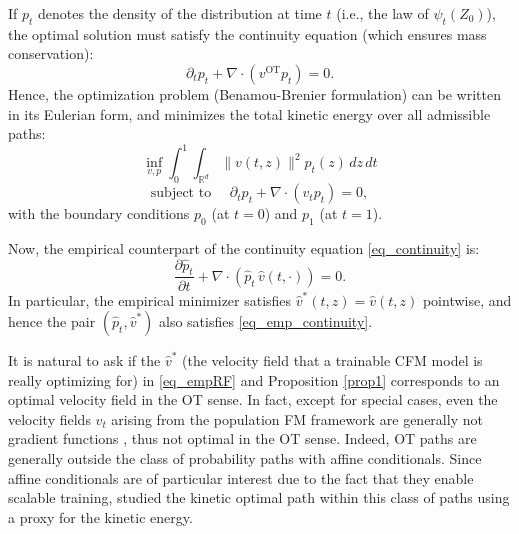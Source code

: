 \documentclass[a4paper,11pt]{article}
\newcommand{\R}{\mathbb{R}}
\theoremstyle{plain}
\theoremstyle{definition}
\newtheorem{remark}{Remark}[section]
\begin{document}
If $p_t$ denotes the density of the distribution at time $t$ (i.e., the law of $\psi_t(Z_0)$), the optimal solution must satisfy the continuity equation (which ensures mass conservation):
$$\partial_t p_t + \nabla \cdot (v^{\text{OT}} p_t) = 0.$$
Hence, the optimization problem (Benamou-Brenier formulation) can be written in its Eulerian form, and minimizes the total kinetic energy over all admissible paths:
$$\inf_{v, p} \int_0^1 \int_{\mathbb{R}^d}  \|v(t, z)\|^2 p_t(z) \, dz \, dt$$$$\text{subject to } \quad \partial_t p_t + \nabla \cdot (v_t p_t) = 0,$$
with the boundary conditions  $p_0$ (at $t=0$) and  $p_1$ (at $t=1$). 

Now, the empirical counterpart of the continuity equation \eqref{eq_continuity} is:
\begin{equation} \label{eq_emp_continuity}
    \frac{\partial \hat{p}_t}{\partial t} + \nabla \cdot (\hat{p}_t \, \hat{v}(t,\cdot)) = 0.
\end{equation}
In particular, the empirical minimizer satisfies $\hat v^{*}(t,z)=\hat v(t,z)$ pointwise, and hence the pair $(\hat p_t,\hat v^{*})$ also satisfies \eqref{eq_emp_continuity}.






It is natural to ask if the $\hat{v}^*$ (the velocity field that a trainable CFM model is really optimizing for) in \eqref{eq_empRF} and Proposition \ref{prop1} corresponds to an optimal velocity field in the OT sense. 
In fact, except for special cases, even the velocity fields $v_t$ arising from the population FM framework are generally not gradient functions \cite{wald2025flow, liu2022rectified}, thus not optimal in the OT sense. Indeed, OT paths are generally outside the class of probability paths with affine conditionals. Since affine conditionals are of particular interest due to the fact that they enable scalable training, \cite{shaul2023kinetic} studied the kinetic optimal path within this class of paths using a proxy for the kinetic energy.
\end{document}
